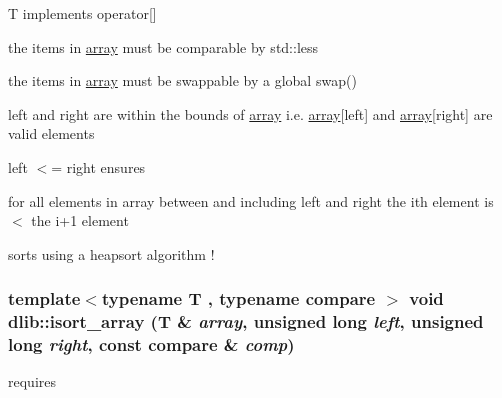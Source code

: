 \begin{DoxyItemize}
\item T implements operator\mbox{[}\mbox{]}
\item the items in \hyperlink{classdlib_1_1array}{array} must be comparable by std::less
\item the items in \hyperlink{classdlib_1_1array}{array} must be swappable by a global swap()
\item left and right are within the bounds of \hyperlink{classdlib_1_1array}{array} i.e. \hyperlink{classdlib_1_1array}{array}\mbox{[}left\mbox{]} and \hyperlink{classdlib_1_1array}{array}\mbox{[}right\mbox{]} are valid elements
\item left $<$= right ensures
\item for all elements in array between and including left and right the ith element is $<$ the i+1 element
\item sorts using a heapsort algorithm ! 
\end{DoxyItemize}\hypertarget{namespacedlib_a67b8e8c3f84cc73d4335f36131d6dd3f}{
\subsubsection[{isort\_\-array}]{\setlength{\rightskip}{0pt plus 5cm}template$<$typename T , typename compare $>$ void dlib::isort\_\-array (T \& {\em array}, \/  unsigned long {\em left}, \/  unsigned long {\em right}, \/  const compare \& {\em comp})}}
\label{namespacedlib_a67b8e8c3f84cc73d4335f36131d6dd3f}
requires
